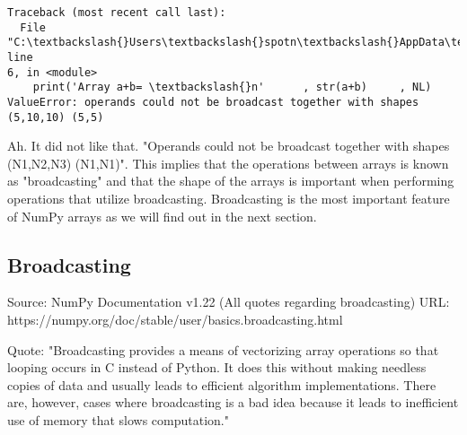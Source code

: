 \documentclass[11pt]{article}
\begin{document}
    \begin{Verbatim}[commandchars=\\\{\}]
Traceback (most recent call last):
  File "C:\textbackslash{}Users\textbackslash{}spotn\textbackslash{}AppData\textbackslash{}Local\textbackslash{}Temp/ipykernel\_15032/2001332600.py", line
6, in <module>
    print('Array a+b= \textbackslash{}n'      , str(a+b)     , NL)
ValueError: operands could not be broadcast together with shapes (5,10,10) (5,5)
    \end{Verbatim}
Ah. It did not like that. "Operands could not be broadcast together with shapes (N1,N2,N3) (N1,N1)". This implies that the operations between arrays is known as "broadcasting" and that the shape of the arrays is important when performing operations that utilize broadcasting. Broadcasting is the most important feature of NumPy arrays as we will find out in the next section. 
    \hypertarget{broadcasting}{%
\subsection{Broadcasting}\label{broadcasting}}
Source: NumPy Documentation v1.22 (All quotes regarding broadcasting)
URL: https://numpy.org/doc/stable/user/basics.broadcasting.html

Quote: "Broadcasting provides a means of vectorizing array operations so that looping occurs in C instead of Python. It does this without making needless copies of data and usually leads to efficient algorithm implementations. There are, however, cases where broadcasting is a bad idea because it leads to inefficient use of memory that slows computation."
\end{document}
